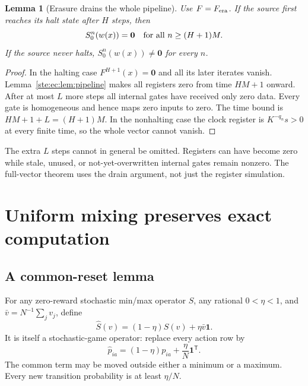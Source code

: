 \documentclass[11pt,letterpaper]{article}
\newtheorem{lemma}[theorem]{Lemma}
\theoremstyle{definition}
\theoremstyle{remark}
\newcommand{\one}{\mathbf 1}
\newcommand{\zero}{\mathbf 0}
\begin{document}
\begin{lemma}[Erasure drains the whole pipeline]
\label{ste:ec:lem:erasure}
Use $F=F_{\rm era}$. If the source first reaches its halt state after
$H$ steps, then
\begin{equation}
 S_0^n(w(x))=\zero\quad\hbox{for all }n\geq(H+1)M.
 \label{ste:ec:eq:drain-bound}
\end{equation}
If the source never halts, $S_0^n(w(x))\neq\zero$ for every $n$.
\end{lemma}

\begin{proof}
In the halting case $F^{H+1}(x)=\zero$ and all its later iterates vanish.
Lemma~\ref{ste:ec:lem:pipeline} makes all registers zero from time $HM+1$
onward. After at most $L$ more steps all internal gates have received
only zero data. Every gate is homogeneous and hence maps zero inputs to
zero. The time bound is $HM+1+L=(H+1)M$.
In the nonhalting case the clock register is $K^{-q_n}s>0$ at every finite
time, so the whole vector cannot vanish.
\end{proof}

The extra $L$ steps cannot in general be omitted. Registers can have
become zero while stale, unused, or not-yet-overwritten internal gates
remain nonzero. The full-vector theorem uses the drain argument, not
just the register simulation.

\section{Uniform mixing preserves exact computation}
\label{ste:ec:sec:mixing}

\subsection{A common-reset lemma}

For any zero-reward stochastic min/max operator $S$, any rational
$0<\eta<1$, and $\bar v=N^{-1}\sum_jv_j$, define
\begin{equation}
 \widehat S(v)=(1-\eta)S(v)+\eta\bar v\one.
 \label{ste:ec:eq:reset}
\end{equation}
It is itself a stochastic-game operator: replace every action row by
\begin{equation}
 \widehat p_{ia}=(1-\eta)p_{ia}+\frac\eta N\one^{\mathsf T}.
 \label{ste:ec:eq:reset-rows}
\end{equation}
The common term may be moved outside either a minimum or a maximum.
Every new transition probability is at least $\eta/N$.
\end{document}
